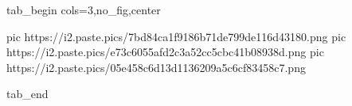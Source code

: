  
 
 
 
 


\ifcmt
  tab_begin cols=3,no_fig,center

     pic https://i2.paste.pics/7bd84ca1f9186b71de799de116d43180.png
		 pic https://i2.paste.pics/e73c6055afd2c3a52cc5cbc41b08938d.png
		 pic https://i2.paste.pics/05e458c6d13d1136209a5c6cf83458c7.png

  tab_end
\fi
